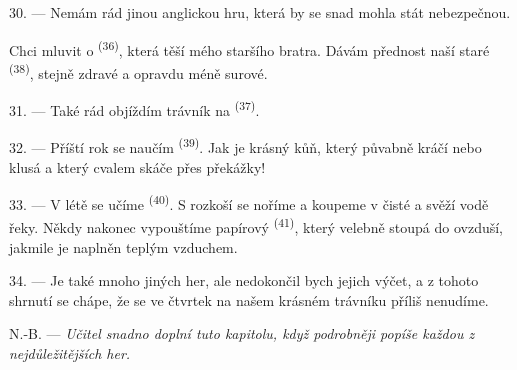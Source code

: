 30. --- Nemám rád jinou anglickou hru, která by se snad mohla stát nebezpečnou.

Chci mluvit o  \textsuperscript{(36)}, která těší mého staršího bratra.
Dávám přednost naší staré  \textsuperscript{(38)}, stejně zdravé a
opravdu méně surové.

\VUsaut{4.6mm}
\VUsaut{3.0mm}

31. --- Také rád objíždím trávník na  \textsuperscript{(37)}.

32. --- Příští rok se naučím  \textsuperscript{(39)}. Jak je
krásný kůň, který půvabně kráčí nebo klusá a který cvalem skáče přes překážky!

33. --- V létě se učíme  \textsuperscript{(40)}. S rozkoší se noříme a
koupeme v čisté a svěží vodě řeky. Někdy nakonec vypouštíme papírový 
\textsuperscript{(41)}, který velebně stoupá do ovzduší, jakmile je naplněn teplým
vzduchem.

34. --- Je také mnoho jiných her, ale nedokončil bych jejich výčet, a z tohoto shrnutí
se chápe, že se ve čtvrtek na našem krásném trávníku příliš nenudíme.

N.-B. --- \textit{Učitel snadno doplní tuto kapitolu, když podrobněji popíše každou z
nejdůležitějších her.}

